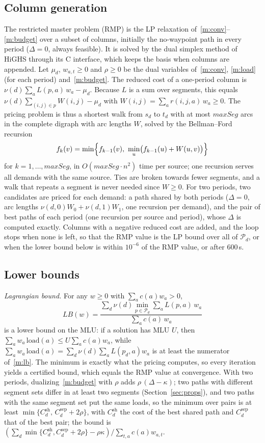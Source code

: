 \documentclass[conference]{IEEEtran}
\begin{document}
\subsection{Column generation}
The restricted master problem (RMP) is the LP relaxation of~\eqref{m:conv}--\eqref{m:budget} over a subset of columns, initially the no-waypoint path in every period ($\Delta=0$, always feasible). It is solved by the dual simplex method of HiGHS through its C interface, which keeps the basis when columns are appended. Let $\mu_d$, $w_{a,t}\ge0$ and $\rho\ge0$ be the dual variables of~\eqref{m:conv}, \eqref{m:load} (for each period) and~\eqref{m:budget}. The reduced cost of a one-period column is $\nu(d)\sum_a L(p,a)\,w_a-\mu_d$. Because $L$ is a sum over segments, this equals $\nu(d)\sum_{(i,j)\in p}W(i,j)-\mu_d$ with $W(i,j)=\sum_a r(i,j,a)\,w_a\ge0$. The pricing problem is thus a shortest walk from $s_d$ to $t_d$ with at most $maxSeg$ arcs in the complete digraph with arc lengths $W$, solved by the Bellman--Ford recursion
\[
f_k(v)=\min\Bigl\{f_{k-1}(v),\ \min_{u}\bigl(f_{k-1}(u)+W(u,v)\bigr)\Bigr\}
\]
for $k=1,\dots,maxSeg$, in $O(maxSeg\cdot n^2)$ time per source; one recursion serves all demands with the same source. Ties are broken towards fewer segments, and a walk that repeats a segment is never needed since $W\ge0$. For two periods, two candidates are priced for each demand: a path shared by both periods ($\Delta=0$, arc lengths $\nu(d,0)W_0+\nu(d,1)W_1$, one recursion per demand), and the pair of best paths of each period (one recursion per source and period), whose $\Delta$ is computed exactly. Columns with a negative reduced cost are added, and the loop stops when none is left, so that the RMP value is the LP bound over all of $\mathcal P_d$, or when the lower bound below is within $10^{-6}$ of the RMP value, or after 600\,s.

\subsection{Lower bounds}
\emph{Lagrangian bound.} For any $w\ge0$ with $\sum_a c(a)w_a>0$,
\begin{equation}
LB(w)=\frac{\sum_d\nu(d)\min_{p\in\mathcal P_d}\sum_a L(p,a)\,w_a}{\sum_a c(a)\,w_a}\label{m:lb}
\end{equation}
is a lower bound on the MLU: if a solution has MLU $U$, then $\sum_a w_a\,\mathrm{load}(a)\le U\sum_a c(a)w_a$, while $\sum_a w_a\,\mathrm{load}(a)=\sum_d\nu(d)\sum_a L(p_d,a)w_a$ is at least the numerator of~\eqref{m:lb}. The minimum is exactly what the pricing computes, so every iteration yields a certified bound, which equals the RMP value at convergence. With two periods, dualizing~\eqref{m:budget} with $\rho$ adds $\rho\,(\Delta-\kappa)$; two paths with different segment sets differ in at least two segments (Section~\ref{sec:props}), and two paths with the same segment set put the same loads, so the minimum over pairs is at least $\min\{C^{\mathrm{sh}}_d,\,C^{\mathrm{sep}}_d+2\rho\}$, with $C^{\mathrm{sh}}_d$ the cost of the best shared path and $C^{\mathrm{sep}}_d$ that of the best pair; the bound is $(\sum_d\min\{C^{\mathrm{sh}}_d,C^{\mathrm{sep}}_d+2\rho\}-\rho\kappa)/\sum_{t,a}c(a)w_{a,t}$.
\end{document}
